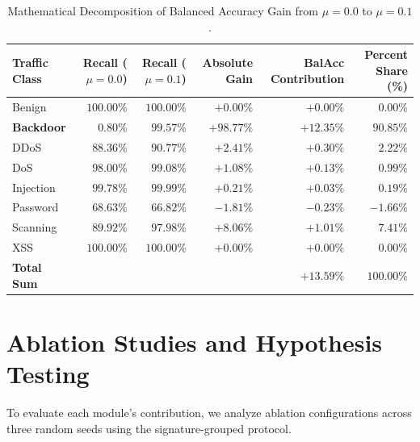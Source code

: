 \documentclass[12pt,a4paper]{report}
\begin{document}
\begin{table}[H]
\centering
\caption{Mathematical Decomposition of Balanced Accuracy Gain from $\mu=0.0$ to $\mu=0.1$.}
\label{tab:gain_decomposition}
\small
\begin{tabularx}{\textwidth}{Xrrrrr}
\toprule
\textbf{Traffic Class} & \textbf{Recall ($\mu=0.0$)} & \textbf{Recall ($\mu=0.1$)} & \textbf{Absolute Gain} & \textbf{BalAcc Contribution} & \textbf{Percent Share (\%)} \\
\midrule
Benign & $100.00\%$ & $100.00\%$ & $+0.00\%$ & $+0.00\%$ & $0.00\%$ \\
\textbf{Backdoor} & $\mathbf{0.80\%}$ & $\mathbf{99.57\%}$ & $\mathbf{+98.77\%}$ & $\mathbf{+12.35\%}$ & $\mathbf{90.85\%}$ \\
DDoS & $88.36\%$ & $90.77\%$ & $+2.41\%$ & $+0.30\%$ & $2.22\%$ \\
DoS & $98.00\%$ & $99.08\%$ & $+1.08\%$ & $+0.13\%$ & $0.99\%$ \\
Injection & $99.78\%$ & $99.99\%$ & $+0.21\%$ & $+0.03\%$ & $0.19\%$ \\
Password & $68.63\%$ & $66.82\%$ & $-1.81\%$ & $-0.23\%$ & $-1.66\%$ \\
Scanning & $89.92\%$ & $97.98\%$ & $+8.06\%$ & $+1.01\%$ & $7.41\%$ \\
XSS & $100.00\%$ & $100.00\%$ & $+0.00\%$ & $+0.00\%$ & $0.00\%$ \\
\midrule
\textbf{Total Sum} & & & & $\mathbf{+13.59\%}$ & $\mathbf{100.00\%}$ \\
\bottomrule
\end{tabularx}
\end{table}

\section{Ablation Studies and Hypothesis Testing}
\label{sec:ablation_studies}

To evaluate each module's contribution, we analyze ablation configurations across three random seeds using the signature-grouped protocol.
\end{document}
